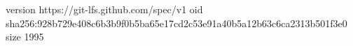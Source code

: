 version https://git-lfs.github.com/spec/v1
oid sha256:928b729e408c6b3b9f0b5ba65e17cd2c53e91a40b5a12b63c6ca2313b501f3e0
size 1995
